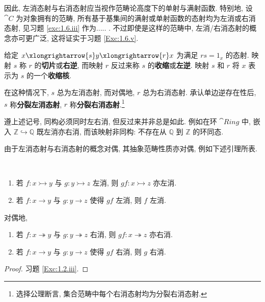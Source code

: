 \par 因此, 左消态射与右消态射应当视作范畴论高度下的单射与满射函数. 特别地, 设 \(\cat C\) 为对象拥有的范畴, 所有基于基集间的满射或单射函数的态射均为左消或右消态射, 见习题 \ref{exc:1.6.iii} 作为..... . 不过即使是这样的范畴中, 左消/右消态射的概念亦可更广泛, 这将证实于习题 \ref{Exc:1.6.v}.
\begin{example}
    给定 \(x\xlongrightarrow{s}y\xlongrightarrow{r}x\) 为满足 \(rs=1_x\) 的态射. 映射 \(s\) 称 \(r\) 的\textbf{切片}或\textbf{右逆}, 而映射 \(r\) 反过来称 \(s\) 的\textbf{收缩}或\textbf{左逆}. 映射 \(s\) 和 \(r\) 将 \(x\) 表示为 \(s\) 的一个\textbf{收缩核}.
\par 在这种情况下, \(s\) 总为左消态射, 而对偶地, \(r\) 总为右消态射. 承认单边逆存在性后, \(s\) 称\textbf{分裂左消态射}, \(r\) 称\textbf{分裂右消态射}.\footnote{选择公理断言, 集合范畴中每个右消态射均为分裂右消态射.}
\end{example}
\begin{example}
    遵上述记号, 同构必须同时左右消, 但反过来并非总是如此. 例如在环 \(\cat{Ring}\) 中, 嵌入 \(\mathbb Z\hookrightarrow\mathbb Q\) 既左消亦右消, 而该映射非同构: 不存在从 \(\mathbb Q\) 到 \(\mathbb Z\) 的环同态.
\end{example}
\par 由于左消态射与右消态射的概念对偶, 其抽象范畴性质亦对偶, 例如下述引理所表.
\begin{lemma}\label{Lem:1.2.11}
    \ \par\begin{enumerate}[label=(\roman*)]
        \item 若 \(f\colon x\rightarrowtail y \) 与 \(g\colon y\rightarrowtail z\) 左消, 则 \(gf\colon x\rightarrowtail z\) 亦左消.
        \item 若 \(f\colon x\to y\) 与 \(g\colon y\to z\) 使得 \(gf\) 左消, 则 \(f\) 左消.
    \end{enumerate}对偶地,\begin{enumerate}[label=(\roman*')]
        \item 若 \(f\colon x\twoheadrightarrow y\) 与 \(g\colon y\twoheadrightarrow z\) 右消, 则 \(gf\colon x\twoheadrightarrow z\) 亦右消.
        \item 若 \(f\colon x\to y \) 与 \(g\colon y\to z\) 使得 \(gf\) 右消, 则 \(g\) 右消.
    \end{enumerate}
\end{lemma}
\begin{proof}
    习题 \ref{Exc:1.2.iii}.
\end{proof}

